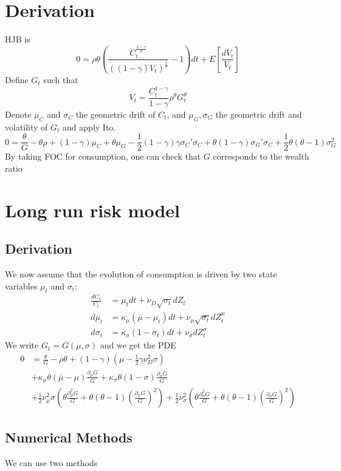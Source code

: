 \documentclass[english]{article}
\begin{document}
\section{Derivation}
HJB is
$$0 = \rho \theta (\frac{C_t^{\frac{1-\gamma}{\theta}}}{((1-\gamma)V_t)^{\frac{1}{\theta}}}-1)dt + E[\frac{dV_t}{V_t}]$$
Define $G_t$ such that
$$V_t = \frac{C_t^{1-\gamma}}{1-\gamma}\rho^\theta G_t^\theta$$
Denote $\mu_{C}$ and $\sigma_{C}$ the geometric drift of $C_t$, and $\mu_G, \sigma_G$ the geometric drift and volatility of $G_t$ and apply Ito.
$$0 = \frac{\theta}{G} - \theta\rho + (1-\gamma)\mu_{C}  + \theta\mu_G - \frac{1}{2}(1-\gamma)\gamma\sigma_{C}'\sigma_{C} + \theta(1-\gamma)\sigma_G'\sigma_{C} + \frac{1}{2}\theta(\theta-1)\sigma_G^2$$
By taking FOC for consumption, one can check that $G$ corresponds to the wealth ratio

\section{Long run risk model}

\subsection{Derivation}
We now assume that the evolution of consumption is driven by two state variables $\mu_{t}$ and $\sigma_{t}$:
\begin{align*}
	\frac{dC_{t}}{C_{t}} & =  \mu_{t}dt+\nu_{D}\sqrt{\sigma_{t}}dZ_{t}\\
	d\mu_{t} & =  \kappa_{\mu}(\bar{\mu}-\mu_{t})dt+\nu_{\mu}\sqrt{\sigma_{t}}dZ_{t}^{\mu}\\
	d\sigma_{t} & =  \kappa_{\sigma}(1-\sigma_{t})dt+\nu_{\sigma}dZ_{t}^{\sigma}
\end{align*}
We write $G_t = G(\mu, \sigma)$ and we get the PDE
\begin{align*}
	0&= \frac{\theta}{G} - \rho \theta +  (1-\gamma)(\mu - \frac{1}{2}\gamma\nu_D^2\sigma)\\
	&+  \kappa_{\mu}\theta(\bar{\mu}-\mu)\frac{\partial_\mu G}{G}+  \kappa_{\sigma}\theta(1-\sigma)\frac{\partial_\sigma G}{G}\\
	&+\frac{1}{2}\nu^2_\mu\sigma(\theta\frac{\partial^{2}_\mu G}{G}+ \theta(\theta-1)(\frac{\partial_\mu G}{G})^2) + \frac{1}{2}\nu^2_\sigma(\theta\frac{\partial^{2}_\sigma G}{G}+ \theta(\theta-1)(\frac{\partial_\sigma G}{G})^2)
\end{align*}

\subsection{Numerical Methods}
We can use two methods
\end{document}
